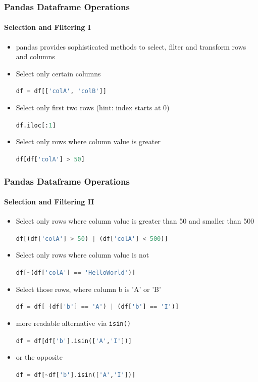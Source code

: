 \documentclass[12pt,ngerman]{beamer}
\newcommand{\pyc}[1]{\lstinline[language={Python}]{#1}}
\begin{document}
\begin{frame}[fragile]
\frametitle{Pandas Dataframe Operations}
\framesubtitle{Selection and Filtering I}

\begin{itemize}
	\item pandas provides sophisticated methods to select, filter and transform rows and columns
\end{itemize}

\begin{itemize}
\item Select only certain columns

\pyc{df = df[['colA', 'colB']]}

\item Select only first two rows (hint: index starts at 0)

\pyc{df.iloc[:1]}

\item Select only rows where column value is greater

\pyc{df[df['colA'] > 50]}
\end{itemize}
\end{frame}

\begin{frame}[fragile]
\frametitle{Pandas Dataframe Operations}
\framesubtitle{Selection and Filtering II}

\begin{itemize}
\item Select only rows where column value is greater  \newline than 50 and smaller than 500

\pyc{df[(df['colA'] > 50) | (df['colA'] < 500)]}

\item Select only rows where column value is not

\pyc{df[~(df['colA'] == 'HelloWorld')]}

\item Select those rows, where column b is 'A' or 'B'

\pyc{df = df[ (df['b'] == 'A') | (df['b'] == 'I')]}

\item more readable alternative via \pyc{isin()}

\pyc{df = df[df['b'].isin(['A','I'])]}

\item or the opposite

\pyc{df = df[~df['b'].isin(['A','I'])]}


\end{itemize}
\end{frame}
\end{document}
